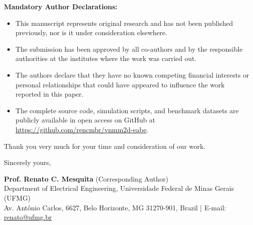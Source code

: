 \documentclass[10.5pt,a4paper]{article}
\begin{document}
\textbf{Mandatory Author Declarations:}
\begin{itemize}[noitemsep,topsep=1pt,parsep=0.5pt]
    \item This manuscript represents original research and has not been published previously, nor is it under consideration elsewhere.
    \item The submission has been approved by all co-authors and by the responsible authorities at the institutes where the work was carried out.
    \item The authors declare that they have no known competing financial interests or personal relationships that could have appeared to influence the work reported in this paper.
    \item The complete source code, simulation scripts, and benchmark datasets are publicly available in open access on GitHub at \url{https://github.com/rencmbr/vnmm2d-eabe}.
\end{itemize}

Thank you very much for your time and consideration of our work.

\vspace{0.3em}
Sincerely yours,

\textbf{Prof. Renato C. Mesquita} (Corresponding Author) \\
Department of Electrical Engineering, Universidade Federal de Minas Gerais (UFMG) \\
Av. Antônio Carlos, 6627, Belo Horizonte, MG 31270-901, Brazil \quad | \quad E-mail: \href{mailto:renato@ufmg.br}{renato@ufmg.br}
\end{document}

